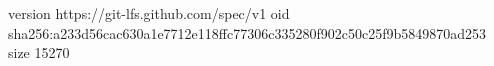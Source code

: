 version https://git-lfs.github.com/spec/v1
oid sha256:a233d56cac630a1e7712e118ffc77306c335280f902c50c25f9b5849870ad253
size 15270
